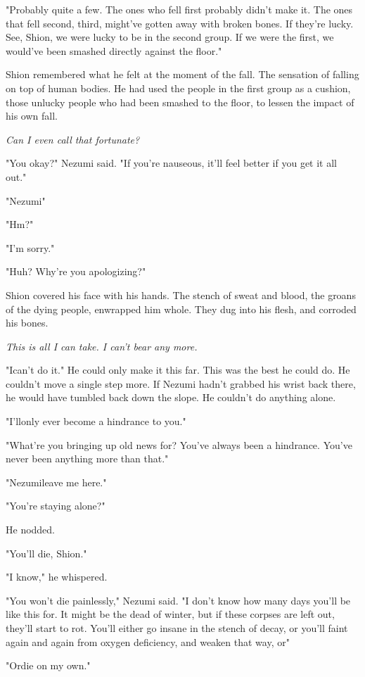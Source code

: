 "Probably quite a few. The ones who fell first probably didn't make it.
The ones that fell second, third, might've gotten away with broken
bones. If they're lucky. See, Shion, we were lucky to be in the second
group. If we were the first, we would've been smashed directly against
the floor."

Shion remembered what he felt at the moment of the fall. The sensation
of falling on top of human bodies. He had used the people in the first
group as a cushion, those unlucky people who had been smashed to the
floor, to lessen the impact of his own fall.

\emph{Can I even call that fortunate?}

"You okay?" Nezumi said. "If you're nauseous, it'll feel better if you
get it all out."

"Nezumi\el "

"Hm?"

"I'm sorry."

"Huh? Why're you apologizing?"

Shion covered his face with his hands. The stench of sweat and blood,
the groans of the dying people, enwrapped him whole. They dug into his
flesh, and corroded his bones.

\emph{This is all I can take. I can't bear any more.}

"I\el can't do it." He could only make it this far. This was the best he
could do. He couldn't move a single step more. If Nezumi hadn't grabbed
his wrist back there, he would have tumbled back down the slope. He
couldn't do anything alone.

"I'll\el only ever become a hindrance to you."

"What're you bringing up old news for? You've always been a hindrance.
You've never been anything more than that."

"Nezumi\el leave me here."

"You're staying alone?"

He nodded.

"You'll die, Shion."

"I know," he whispered.

"You won't die painlessly," Nezumi said. "I don't know how many days
you'll be like this for. It might be the dead of winter, but if these
corpses are left out, they'll start to rot. You'll either go insane in
the stench of decay, or you'll faint again and again from oxygen
deficiency, and weaken that way, or\el "

"Or\el die on my own."

